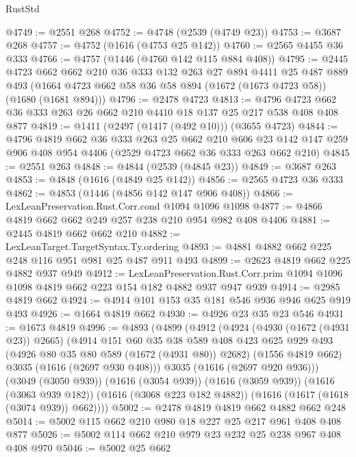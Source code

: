 \begin{lexlean}{RustStd}
\begin{coremodule}
{\begin{coremodule}
{{{{{{{{{{{@4749 := @2551 @268
@4752 := @4748 (@2539 (@4749 @23))
@4753 := @3687 @268
@4757 := @4752 (@1616 (@4753 @25 @142))
@4760 := @2565 @4455 @36 @333
@4766 := @4757 (@1446 (@4760 @142 @115 @884 @408))
@4795 := @2445
    @4723
    @662
    @662
    @210
    @36
    @333
    @132
    @263
    @27
    @894
    @4411
    @25
    @487
    @889
    @493
    (@1664 @4723 @662 @58 @36 @58 @894 (@1672 (@1673 @4723 @58)) (@1680 (@1681 @894)))
@4796 := @2478 @4723
@4813 := @4796 @4723 @662 @36 @333 @263 @26 @662 @210 @4410 @18 @137 @25 @217 @538 @408 @408 @877
@4819 := @1411 (@2497 (@1417 (@492 @10))) (@3655 @4723)
@4844 := @4796
    @4819
    @662
    @36
    @333
    @263
    @25
    @662
    @210
    @606
    @23
    @142
    @147
    @259
    @906
    @408
    @954
    @4406
    (@2529 @4723 @662 @36 @333 @263 @662 @210)
@4845 := @2551 @263
@4848 := @4844 (@2539 (@4845 @23))
@4849 := @3687 @263
@4853 := @4848 (@1616 (@4849 @25 @142))
@4856 := @2565 @4723 @36 @333
@4862 := @4853 (@1446 (@4856 @142 @147 @906 @408))
@4866 := LexLeanPreservation.Rust.Corr.cond @1094 @1096 @1098
@4877 := @4866 @4819 @662 @662 @249 @257 @238 @210 @954 @982 @408 @4406
@4881 := @2445 @4819 @662 @662 @210
@4882 := LexLeanTarget.TargetSyntax.Ty.ordering
@4893 := @4881 @4882 @662 @225 @248 @116 @951 @981 @25 @487 @911 @493
@4899 := @2623 @4819 @662 @225 @4882 @937 @949
@4912 := LexLeanPreservation.Rust.Corr.prim
    @1094
    @1096
    @1098
    @4819
    @662
    @223
    @154
    @182
    @4882
    @937
    @947
    @939
@4914 := @2985 @4819 @662
@4924 := @4914 @101 @153 @35 @181 @546 @936 @946 @625 @919 @493
@4926 := @1664 @4819 @662
@4930 := @4926 @23 @35 @23 @546
@4931 := @1673 @4819
@4996 := @4893
    (@4899
      (@4912
        (@4924
          (@4930 (@1672 (@4931 @23)) @2665)
          (@4914
            @151
            @60
            @35
            @38
            @589
            @408
            @423
            @625
            @929
            @493
            (@4926 @80 @35 @80 @589 (@1672 (@4931 @80)) @2682)
            (@1556 @4819 @662)
            @3035
            (@1616 (@2697 @930 @408)))
          @3035
          (@1616 (@2697 @920 @936)))
        (@3049 (@3050 @939))
        (@1616 (@3054 @939))
        (@1616 (@3059 @939))
        (@1616 (@3063 @939 @182))
        (@1616 (@3068 @223 @182 @4882))
        (@1616 (@1617 (@1618 (@3074 @939)) @662))))
@5002 := @2478 @4819 @4819 @662 @4882 @662 @248
@5014 := @5002 @115 @662 @210 @980 @18 @227 @25 @217 @961 @408 @408 @877
@5026 := @5002 @114 @662 @210 @979 @23 @232 @25 @238 @967 @408 @408 @970
@5046 := @5002
    @25
    @662
}}}}}}}}}}}
\end{coremodule}}
\end{coremodule}
\end{lexlean}
